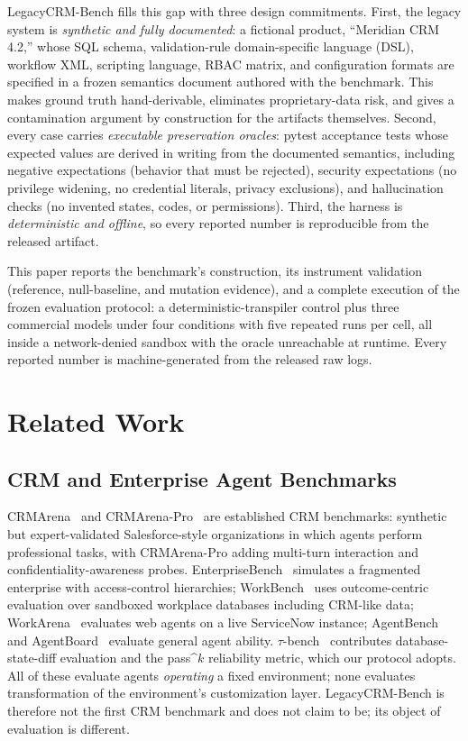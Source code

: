 \documentclass{ieeetj}
\begin{document}
LegacyCRM-Bench fills this gap with three design commitments. First, the legacy system is
\emph{synthetic and fully documented}: a fictional product, ``Meridian CRM 4.2,'' whose SQL
schema, validation-rule domain-specific language (DSL), workflow XML, scripting language,
RBAC matrix, and configuration
formats are specified in a frozen semantics document authored with the benchmark. This makes
ground truth hand-derivable, eliminates proprietary-data risk, and gives a contamination
argument by construction for the artifacts themselves. Second, every case carries
\emph{executable preservation oracles}: pytest acceptance tests whose expected values are
derived in writing from the documented semantics, including negative expectations (behavior
that must be rejected), security expectations (no privilege widening, no credential literals,
privacy exclusions), and hallucination checks (no invented states, codes, or permissions).
Third, the harness is \emph{deterministic and offline}, so every reported number is
reproducible from the released artifact.

This paper reports the benchmark's construction, its instrument validation (reference,
null-baseline, and mutation evidence), and a complete execution of the frozen evaluation
protocol: a deterministic-transpiler control plus three commercial models under four
conditions with five repeated runs per cell, all inside a network-denied sandbox with the
oracle unreachable at runtime. Every reported number is machine-generated from the released
raw logs.

\section{Related Work}
\label{sec:related}
\subsection{CRM and Enterprise Agent Benchmarks}
CRMArena~\cite{huang2025crmarena} and CRMArena-Pro~\cite{huang2025crmarenapro} are established
CRM benchmarks: synthetic but expert-validated Salesforce-style organizations in which agents
perform professional tasks, with CRMArena-Pro adding multi-turn interaction and
confidentiality-awareness probes. EnterpriseBench~\cite{vishwakarma2025enterprisebench}
simulates a fragmented enterprise with access-control hierarchies; WorkBench~\cite{styles2024workbench}
uses outcome-centric evaluation over sandboxed workplace databases including CRM-like data;
WorkArena~\cite{drouin2024workarena} evaluates web agents on a live ServiceNow instance;
AgentBench~\cite{liu2023agentbench} and AgentBoard~\cite{ma2024agentboard} evaluate general
agent ability. $\tau$-bench~\cite{yao2024taubench} contributes database-state-diff evaluation
and the pass\textasciicircum{}$k$ reliability metric, which our protocol adopts. All of these
evaluate agents \emph{operating} a fixed environment; none evaluates transformation of the
environment's customization layer. LegacyCRM-Bench is therefore not the first CRM benchmark and
does not claim to be; its object of evaluation is different.
\end{document}
